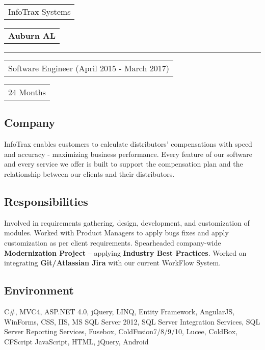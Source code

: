 \documentclass[letterpaper,10pt]{article}
\begin{document}

    \vspace{0.5cm}
    \noindent
    \begin{tabular}[t]{@{}l}
    \Large{InfoTrax Systems}
    \end{tabular}
    \hfill
    \begin{tabular}[t]{l@{}}
    \textbf{Auburn AL}
    \end{tabular}
    \noindent\rule{\textwidth}{0.5pt}
    \begin{tabular}[t]{@{}l}
    Software Engineer (April 2015 - March 2017)
    \end{tabular}
    \hfill
    \begin{tabular}[t]{l@{}}
    24 Months
    \end{tabular}

    \subsection{Company}
    InfoTrax enables customers to calculate distributors’ compensations with speed and accuracy - maximizing business performance. Every feature of our software and every service we offer is built to support the compensation plan and the relationship between our clients and their distributors.

    \subsection{Responsibilities}
    Involved in requirements gathering, design, development, and customization of modules. Worked with Product Managers to apply bugs fixes and apply customization as per client requirements. Spearheaded company-wide \textbf{Modernization Project} – applying \textbf{Industry Best Practices}. Worked on integrating \textbf{Git/Atlassian Jira} with our current WorkFlow System.

    \subsection{Environment}
    C\#, MVC4, ASP.NET 4.0, jQuery, LINQ, Entity Framework, AngularJS, WinForms, CSS, IIS, MS SQL Server 2012, SQL Server Integration Services, SQL Server Reporting Services, Fusebox, ColdFusion7/8/9/10, Lucee, ColdBox, CFScript JavaScript, HTML, jQuery, Android

    \newpage

\end{document}
